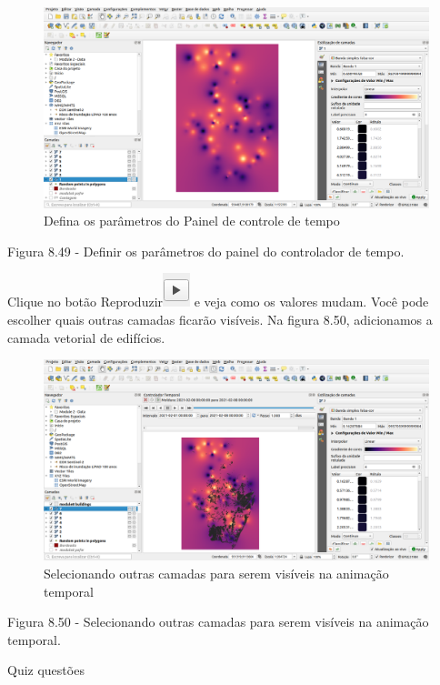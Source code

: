 \documentclass[
  portuguese,
]{krantz}
\begin{document}
\begin{figure}
\centering
\includegraphics{media/modulo8/fig849.png}
\caption{Defina os parâmetros do Painel de controle de tempo}
\end{figure}

Figura 8.49 - Definir os parâmetros do painel do controlador de tempo.

Clique no botão Reproduzir\includegraphics{media/modulo8/play-btn.png} e veja como os valores mudam. Você pode escolher quais outras camadas ficarão visíveis. Na figura 8.50, adicionamos a camada vetorial de edifícios.

\begin{figure}
\centering
\includegraphics{media/modulo8/fig850.png}
\caption{Selecionando outras camadas para serem visíveis na animação temporal}
\end{figure}

Figura 8.50 - Selecionando outras camadas para serem visíveis na animação temporal.

Quiz questões
\end{document}
